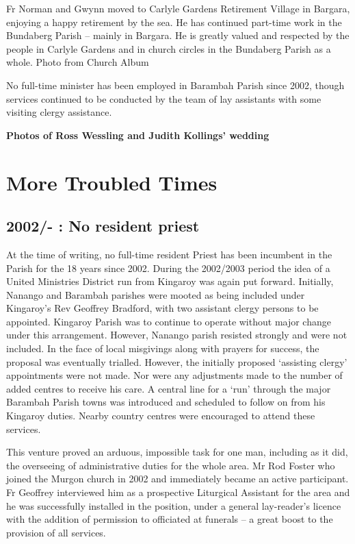 Fr Norman and Gwynn moved to Carlyle Gardens Retirement Village in Bargara, enjoying a happy retirement by the sea. He has continued part-time work in the Bundaberg Parish -- mainly in Bargara. He is greatly valued and respected by the people in Carlyle Gardens and in church circles in the Bundaberg Parish as a whole. Photo from Church Album

No full-time minister has been employed in Barambah Parish since 2002, though services continued to be conducted by the team of lay assistants with some visiting clergy assistance.

\textbf{Photos of Ross Wessling and Judith Kollings' wedding}

\hypertarget{more-troubled-times}{%
\chapter{More Troubled Times}\label{more-troubled-times}}

\hypertarget{no-resident-priest}{%
\section{2002/- : No resident priest}\label{no-resident-priest}}

At the time of writing, no full-time resident Priest has been incumbent in the Parish for the 18 years since 2002. During the 2002/2003 period the idea of a United Ministries District run from Kingaroy was again put forward. Initially, Nanango and Barambah parishes were mooted as being included under Kingaroy's Rev Geoffrey Bradford, with two assistant clergy persons to be appointed. Kingaroy Parish was to continue to operate without major change under this arrangement. However, Nanango parish resisted strongly and were not included. In the face of local misgivings along with prayers for success, the proposal was eventually trialled. However, the initially proposed `assisting clergy' appointments were not made. Nor were any adjustments made to the number of added centres to receive his care. A central line for a `run' through the major Barambah Parish towns was introduced and scheduled to follow on from his Kingaroy duties. Nearby country centres were encouraged to attend these services.

This venture proved an arduous, impossible task for one man, including as it did, the overseeing of administrative duties for the whole area. Mr Rod Foster who joined the Murgon church in 2002 and immediately became an active participant. Fr Geoffrey interviewed him as a prospective Liturgical Assistant for the area and he was successfully installed in the position, under a general lay-reader's licence with the addition of permission to officiated at funerals -- a great boost to the provision of all services.

